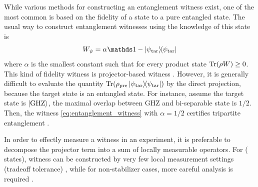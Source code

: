 \documentclass[
reprint,
aps,
pra,
floatfix,
]{revtex4-2}
\theoremstyle{plain}
\theoremstyle{definition}
\newtheorem{remark}{Remark}
\newcommand{\ew}{W}
\newcommand{\ob}{O}
\newcommand{\dm}{\rho}
\newcommand{\ghz}{\text{GHZ}}
\newcommand{\target}{\textup{tar}}
\newcommand{\prepare}{\textup{pre}}
\begin{document}
While various methods for constructing an entanglement witness exist, one of the most common is based on the fidelity of a state to a pure entangled state.
The usual way to construct entanglement witnesses using the knowledge of this state is
\begin{equation}
	\ew_{\psi} = \alpha\identity - \op{\psi_\target} 
	\label{eq:entanglement_witness}
\end{equation}
where $\alpha$ is the smallest constant such that for every product state $\Tr(\dm\ew)\ge 0$.
This kind of fidelity witness is projector-based witness \cite{bourennaneWitnessingMultipartiteEntanglement2004}.
However, it is generally difficult to evaluate the quantity $\Tr(\dm_{\prepare} \op{\psi_{\target}})$ by the direct projection, because the target state is an entangled state.
For instance, assume the target state is $\ket{\ghz}$,
the maximal overlap between GHZ and bi-separable state is $1/2$.
Then, the witness \cref{eq:entanglement_witness} with $\alpha=1/2$ certifies tripartite entanglement 
\cite{acinClassificationMixedThreequbit2001}.

In order to effectly measure a witness in an experiment, it is preferable to decompose the projector term into a sum of locally measurable operators. 
For  ( states),
witness can be constructed by very few local measurement settings (tradeoff tolerance) \cite{tothDetectingGenuineMultipartite2005} \cite{tothEntanglementDetectionStabilizer2005} \cite{zhouDetectingMultipartiteEntanglement2019},
while for non-stabilizer cases, more careful analysis is required \cite{zhangEfficientEntanglementGeneration2021} \cite{zhuMachineLearningDerivedEntanglement2021}.
\end{document}
